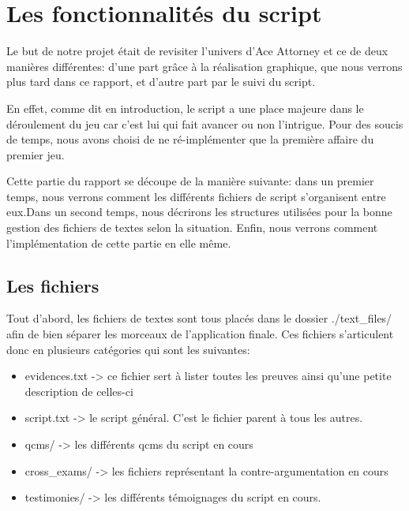 \section{Les fonctionnalités du script}

	Le but de notre projet était de revisiter l'univers d'Ace Attorney et ce de deux manières différentes:
d'une part  grâce à la réalisation graphique, que nous verrons plus tard dans ce rapport, et d'autre part par le suivi du script.\newline

	En effet, comme dit en introduction, le script a une place majeure dans le déroulement du jeu car c'est lui qui fait avancer ou non l'intrigue.\newline
Pour des soucis de temps, nous avons choisi de ne ré-implémenter que la première affaire du premier jeu.\newline

	Cette partie du rapport se découpe de la manière suivante: dans un premier temps, nous verrons comment les différents fichiers de script s'organisent entre eux.Dans un second temps, nous décrirons les structures utilisées pour la bonne gestion des fichiers de textes selon la situation. Enfin, nous verrons comment l'implémentation de cette partie en elle même.\newline

\subsection{Les fichiers}
Tout d'abord, les fichiers de textes sont tous placés dans le dossier ./text\_files/ afin de bien séparer les morceaux de l'application finale.
Ces fichiers s'articulent donc en plusieurs catégories qui sont les suivantes:

\begin{itemize}
	\item evidences.txt -> ce fichier sert à lister toutes les preuves ainsi qu'une petite description de celles-ci
	\item script.txt -> le script général. C'est le fichier parent à tous les autres.
	\item qcms/ -> les différents qcms du script en cours
	\item cross\_exams/ -> les fichiers représentant la contre-argumentation en cours
	\item testimonies/ -> les différents témoignages du script en cours.
\end{itemize}

